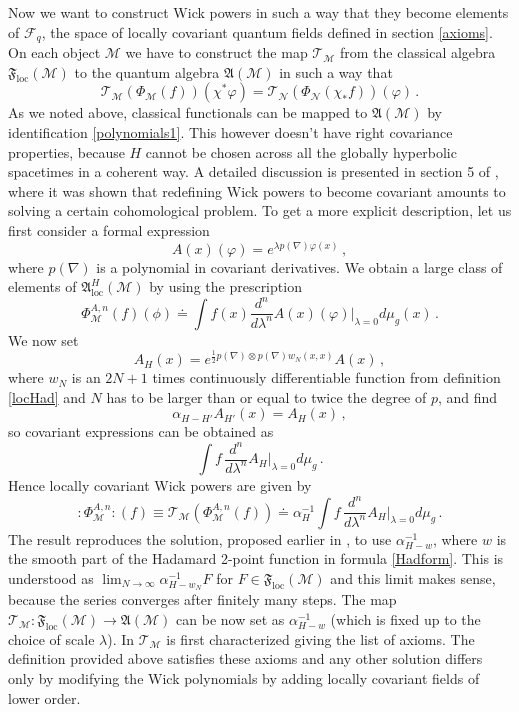\documentclass[12pt]{article}
\newcommand{\fA}{\mathfrak{A}}
\newcommand{\F}{\mathfrak{F}}
\newcommand{\Fcal}{\mathcal{F}}
\newcommand{\Ncal}{\mathcal{N}}
\newcommand{\Mcal}{\mathcal{M}}
\newcommand{\Tcal}{\mathcal{T}}
\newcommand{\loc}{\mathrm{loc}}
\newcommand{\al}{\alpha}
\newcommand{\la}{\lambda}
\newcommand{\ph}{\varphi}
\newcommand{\TT}{\Tcal}
\newcommand{\sst}[1]{\scriptscriptstyle{#1}}  %
\newcommand{\minus}{\sst{-1}}   %
\newcommand{\1}{\mathds{1}}                         %
\newcommand{\be}{\begin{equation}}
\newcommand{\ee}{\end{equation}}
\begin{document}
{{Now we want to construct Wick powers in such a way that they become elements of  $\Fcal_q$, the space of locally covariant quantum fields defined in section \ref{axioms}. On each object $\Mcal$ we have to construct the map ${\TT}_\Mcal$ from the classical algebra $\F_\loc(\Mcal)$ to the quantum algebra $\fA(\Mcal)$ in such a way that
\be
\label{covariance}
{\TT}_{\Mcal}(\Phi_{\Mcal}(f))(\chi^*\ph)={\TT}_{\Ncal}(\Phi_{\Ncal}(\chi_*f))(\ph)\,.
\ee
As we noted above, classical functionals can be mapped  to $\fA(\Mcal)$ by identification \eqref{polynomials1}. This however doesn't have right covariance properties, because $H$ cannot be chosen across all the globally hyperbolic spacetimes in a coherent way. A detailed discussion is presented in section 5 of \cite{BFV}, where it was shown that redefining Wick powers to become covariant amounts to solving a certain cohomological problem. To get a more explicit description, let us first consider a formal expression 
\[
A(x)(\ph)=e^{\la p(\nabla)\ph(x)}\,,
\]
where $p(\nabla)$ is a polynomial in covariant derivatives. We obtain a large class of elements of $\fA^{\sst H}_{\loc}(\Mcal)$ by using the prescription
\[
\Phi^{A,n}_{\Mcal}(f)(\phi)\doteq\int f(x)\frac{d^n}{d\la^n}A(x)(\ph)\big|_{\la=0}d\mu_g(x)\,.
\]
We now set
\[
A_H(x)=e^{\frac12p(\nabla)\otimes p(\nabla)w_N(x,x)}A(x)\,,
\]
where $w_N$ is an $2N + 1$ times continuously
differentiable function from definition \ref{locHad} and $N$ has to be larger than or equal to twice the degree of $p$, and find
\[
\al_{H-H'}A_{H'}(x)=A_H(x)\,,
\]
so covariant expressions can be obtained as
\[
\int f\,\frac{d^n}{d\la^n}A_H \big|_{\la=0}d\mu_g\,.
\]
Hence locally covariant Wick powers are given by
\[
:\Phi^{A,n}_{\Mcal}:(f)\equiv {\TT}_{\Mcal}(\Phi^{A,n}_{\Mcal}(f)) \doteq \al_H^{\minus} \int f\,\frac{d^n}{d\la^n}A_H \big|_{\la=0}d\mu_g\,.
\]
The result reproduces the solution, proposed earlier in \cite{HW}, to use $\al^{-1}_{H-w}$, where $w$ is the smooth part of the Hadamard 2-point function in formula \eqref{Hadform}. This is understood as $\lim_{N\rightarrow \infty} \al^{\minus}_{H-w_N}F$ for $F\in\F_{\loc}(\Mcal)$ and this limit makes sense, because the series converges after finitely many steps. The map ${\TT}_\Mcal:\F_\loc(\Mcal)\rightarrow\fA(\Mcal)$ can be now set as $\al^{-1}_{H-w}$ (which is fixed up to the choice of scale $\la$).  In \cite{HW}  ${\TT}_\Mcal$ is first characterized giving the list of axioms. The definition provided above satisfies these axioms and any other solution differs only by modifying the Wick polynomials by adding locally covariant fields of lower order.
}}
\end{document}
